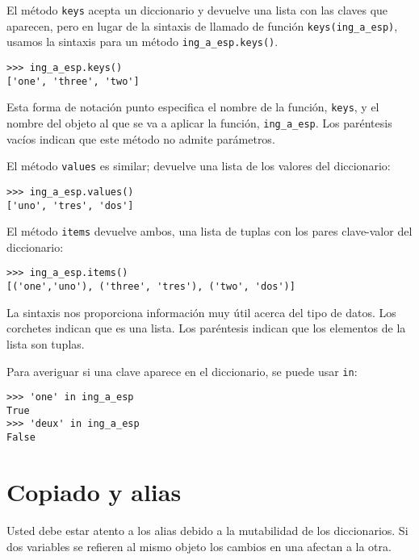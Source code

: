   
 

El método \texttt{keys} acepta un diccionario y devuelve una lista
con las claves que aparecen, pero en lugar de la sintaxis de llamado
de función \texttt{keys(ing\_a\_esp)}, usamos la sintaxis para un
método \texttt{ing\_a\_esp.keys()}.


\begin{lstlisting}
>>> ing_a_esp.keys()
['one', 'three', 'two']
\end{lstlisting}
 Esta forma de notación punto especifica el nombre de la función,
\texttt{keys}, y el nombre del objeto al que se va a aplicar la función,
\texttt{ing\_a\_esp}. Los paréntesis vacíos indican que este método
no admite parámetros.

El método \texttt{values} es similar; devuelve una lista de los valores
del diccionario:
\begin{lstlisting}
>>> ing_a_esp.values()
['uno', 'tres', 'dos']
\end{lstlisting}

El método \texttt{items} devuelve ambos, una lista de tuplas con los
pares clave-valor del diccionario:
\begin{lstlisting}
>>> ing_a_esp.items()
[('one','uno'), ('three', 'tres'), ('two', 'dos')]
\end{lstlisting}

La sintaxis nos proporciona información muy útil acerca del tipo de
datos. Los corchetes indican que es una lista. Los paréntesis indican
que los elementos de la lista son tuplas.

Para averiguar si una clave aparece en el diccionario, se puede usar
\texttt{in}:
\begin{lstlisting}
>>> 'one' in ing_a_esp
True
>>> 'deux' in ing_a_esp
False
\end{lstlisting}


\section{Copiado y alias}

  

Usted debe estar atento a los alias debido a la mutabilidad de los
diccionarios. Si dos variables se refieren al mismo objeto los cambios
en una afectan a la otra.

